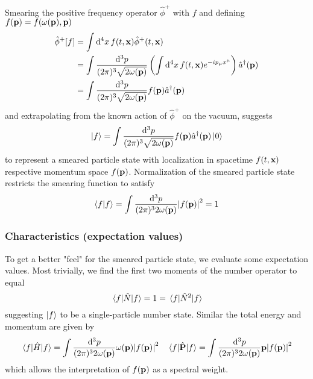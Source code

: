 Smearing the positive frequency operator $\hat\phi^+$  with $f$ and defining $f(\vb{p})=f(\omega(\vb{p}),\vb{p})$
\begin{align}
	\hat\phi^+[f]
	&=
	\int\dd[4]{x}
	f(t,\vb{x})
	\hat\phi^+(t,\vb{x})
	\\
	&=
	\int\frac{\dd[3]{p}}{(2\pi)^3\sqrt{2\omega(\vb{p})}}
	\left(
		\int\dd[4]{x}
		f(t,\vb{x})
		e^{-ip_\mu x^\mu}
	\right)
	\hat{a}^\dagger(\vb{p})
	\\
	&=
	\int\frac{\dd[3]{p}}{(2\pi)^3\sqrt{2\omega(\vb{p})}}
	f(\vb{p})
	\hat{a}^\dagger(\vb{p})
\end{align}
and extrapolating from the known action of $\hat\phi^+$ on the vacuum, suggests
\begin{equation}
	\ket{f}
	=
	\int\frac{\dd[3]{p}}{(2\pi)^3\sqrt{2\omega(\vb{p})}}
	f(\vb{p})\hat{a}^\dagger(\vb{p})\ket{0}
\end{equation}
to represent a smeared particle state with localization in spacetime $f(t,\vb{x})$ respective momentum space $f(\vb{p})$.
Normalization of the smeared particle state restricts the smearing function to satisfy
\begin{equation}
	\bra{f}\ket{f}
	=
	\int\frac{\dd[3]{p}}{(2\pi)^32\omega(\vb{p})}
	\abs{f(\vb{p})}^2
	=
	1
\end{equation}

\subsubsection{Characteristics (expectation values)}

To get a better "feel" for the smeared particle state, we evaluate some expectation values.
Most trivially, we find the first two moments of the number operator to equal
\begin{equation}
	\expval{\hat{N}}{f}
	=
	1
	=
	\expval{\hat{N}^2}{f}
\end{equation}
suggesting $\ket{f}$ to be a single-particle number state.
Similar the total energy and momentum are given by
\begin{align}
	\expval{\hat{H}}{f}
	=
	\int\frac{\dd[3]{p}}{(2\pi)^32\omega(\vb{p})}
	\omega(\vb{p})\abs{f(\vb{p})}^2
	&&
	\expval{\hat{\vb{P}}}{f}
	=
	\int\frac{\dd[3]{p}}{(2\pi)^32\omega(\vb{p})}
	\vb{p}\abs{f(\vb{p})}^2
\end{align}
which allows the interpretation of $f(\vb{p})$ as a spectral weight.

